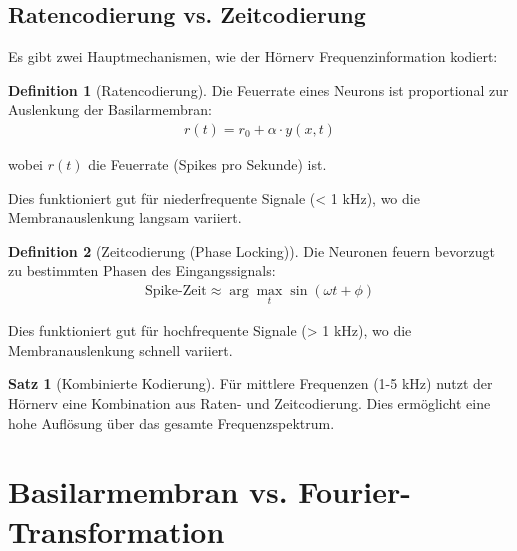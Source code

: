 ﻿\documentclass[a4paper,12pt]{report}
\theoremstyle{definition}
\newtheorem{definition}{Definition}
\newtheorem{satz}{Satz}
\begin{document}
	\subsection{Ratencodierung vs. Zeitcodierung}
	
	Es gibt zwei Hauptmechanismen, wie der Hörnerv Frequenzinformation kodiert:
	
	\begin{definition}[Ratencodierung]
		Die Feuerrate eines Neurons ist proportional zur Auslenkung der Basilarmembran:
		\begin{align}
			r(t) = r_0 + \alpha \cdot y(x,t)
		\end{align}
		
		wobei $r(t)$ die Feuerrate (Spikes pro Sekunde) ist.
		
		Dies funktioniert gut für niederfrequente Signale (< 1 kHz), wo die Membranauslenkung langsam variiert.
	\end{definition}
	
	\begin{definition}[Zeitcodierung (Phase Locking)]
		Die Neuronen feuern bevorzugt zu bestimmten Phasen des Eingangssignals:
		\begin{align}
			\text{Spike-Zeit} \approx \arg\max_t \sin(\omega t + \phi)
		\end{align}
		
		Dies funktioniert gut für hochfrequente Signale (> 1 kHz), wo die Membranauslenkung schnell variiert.
	\end{definition}
	
	\begin{satz}[Kombinierte Kodierung]
		Für mittlere Frequenzen (1-5 kHz) nutzt der Hörnerv eine Kombination aus Raten- und Zeitcodierung. Dies ermöglicht eine hohe Auflösung über das gesamte Frequenzspektrum.
	\end{satz}
	
	\section{Basilarmembran vs. Fourier-Transformation}
	
\end{document}
